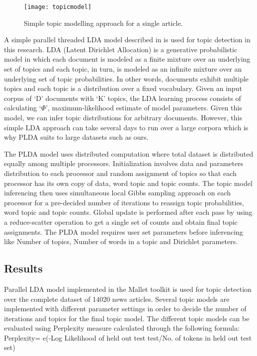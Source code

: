 \begin{figure}[h]
\centering
\texttt{[image: topicmodel]}
\caption{Simple topic modelling approach for a single article\cite{blei2012probabilistic}.}
\end{figure} 

A simple parallel threaded LDA model described in \cite{newman2007distributed}  is used for topic detection in this research.
LDA (Latent Dirichlet Allocation) is a generative probabilistic model in which each document is modeled as a finite mixture over an underlying set of topics and each topic, in turn, is modeled as an infinite mixture over an underlying set of topic probabilities\cite{blei2003latent}. In other words, documents exhibit multiple topics and each topic is a distribution over a fixed vocabulary. 
Given an input corpus of `D' documents with `K' topics, the LDA learning process consists of calculating `${\Phi}$', 
maximum-likelihood estimate of model parameters. Given this model, we can infer
topic distributions for arbitrary documents.  
However, this simple LDA approach can take several days to run over a large corpora which is why PLDA suits to large datasets such as ours.


The PLDA model uses distributed computation where total dataset is distributed equally among multiple processors. Initialization involves data and parameters distribution to each processor and random assignment of topics so that each processor has its own copy of data, word topic and topic counts. The topic model inferencing then uses simultaneous local Gibbs sampling approach on each processor for a pre-decided number of iterations to reassign topic probabilities, word topic and topic counts. Global update is performed after each pass by using a reduce-scatter operation to get a single set of counts and obtain final topic assignments.
The PLDA model requires user set parameters before inferencing like Number of topics, Number of words in a topic and Dirichlet parameters. 


\subsection{Results}

Parallel LDA model implemented in the Mallet\cite{McCallumMALLET} toolkit is used for topic detection over the complete dataset of 14020 news articles. 
Several topic models are implemented with different parameter settings in order to decide the number of iterations and topics for the final topic model. The different topic models can be evaluated using Perplexity measure calculated through the following formula:
Perplexity= e(-Log Likelihood of held out test test/No. of tokens in held out test set)

